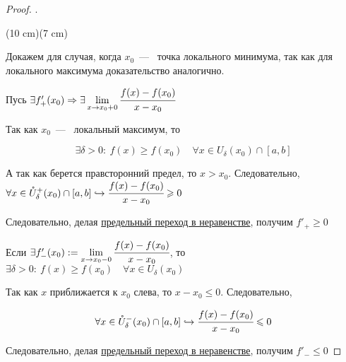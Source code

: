 \begin{proof}
	.
	
	\sidefig(10 cm)(7 cm)	
	{\begin{flushleft}
		
		Докажем для случая, когда $x_{0}$~---~ точка локального минимума, так как для локального максимума доказательство аналогично.	
		
		Пусь $ \exists f'_{+}(x_{0}) \Rightarrow \exists \lim\limits_{x\to x_{0}+0} \cfrac{f(x)-f(x_{0})}{x - x_{0}}$
		
		Так как $x_{0}$~---~ локальный максимум, то
		
		$$\exists \delta > 0: \ f(x)\geq f(x_{0}) \quad \forall x\in U_{\delta}(x_{0}) \cap [a,b]$$
		
		А так как берется правсторонний предел, то $x>x_{0}$. Следовательно,
		$\forall x \in \mathring{U}^{+}_{\delta} (x_{0}) \cap [a, b] \hookrightarrow \cfrac{f(x)-f(x_{0})}{x-x_{0}} \geq 0 
		$
			
	\end{flushleft}
	}
	{
	}
	
	Следовательно, делая \hyperlink{thm4.8}{предельный переход в неравенстве}, получим $f'_{+} \geq 0$
	
	Если $\exists f'_{-}(x_{0}) := \lim\limits_{x\to x_{0}-0} \cfrac{f(x)-f(x_{0})}{x-x_{0}}$, то
	$ \exists \delta > 0: \ f(x) \geq f(x_{0}) \quad \forall x\in U_{\delta}(x_{0})
	$
	
	Так как $x$ приближается к $x_{0}$ слева, то $x-x_{0} \leq 0$. Следовательно,
	
	$$\forall x \in \mathring{U}^{-}_{\delta} (x_{0}) \cap [a, b] \hookrightarrow \cfrac{f(x)-f(x_{0})}{x-x_{0}} \leq 0
	$$
	
	Следовательно, делая \hyperlink{thm4.8}{предельный переход в неравенстве}, получим $f'_{-} \leq 0$
\end{proof}

